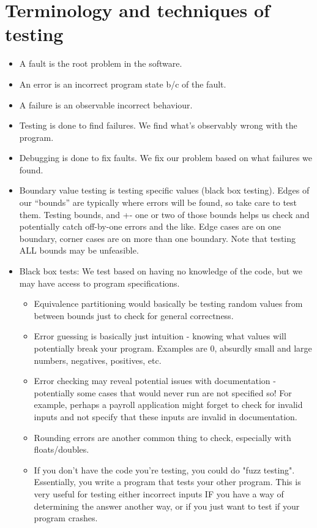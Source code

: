 \documentclass{article}
\author{Clement Tsang}
\begin{document}
\section{Terminology and techniques of testing}
\begin{itemize}
\item A fault is the root problem in the software.  
\item An error is an incorrect program state b/c of the fault.
\item A failure is an observable incorrect behaviour.
\item Testing is done to find failures.  We find what's observably wrong with the program.
\item Debugging is done to fix faults.  We fix our problem based on what failures we found. 
\item Boundary value testing is testing specific values (black box testing).  Edges of our ``bounds'' are typically where errors will be found, so take care to test them.  Testing bounds, and +- one or two of those bounds helps us check and potentially catch off-by-one errors and the like.  Edge cases are on one boundary, corner cases are on more than one boundary.  Note that testing ALL bounds may be unfeasible.
\item Black box tests: We test based on having no knowledge of the code, but we may have access to program specifications.
\begin{itemize}
\item Equivalence partitioning would basically be testing random values from between bounds just to check for general correctness.
\item Error guessing is basically just intuition - knowing what values will potentially break your program.  Examples are 0, absurdly small and large numbers, negatives, positives, etc.
\item Error checking may reveal potential issues with documentation - potentially some cases that would never run are not specified so!  For example, perhaps a payroll application might forget to check for invalid inputs and not specify that these inputs are invalid in documentation.
\item Rounding errors are another common thing to check, especially with floats/doubles.
\item If you don't have the code you're testing, you could do "fuzz testing".  Essentially, you write a program that tests your other program.  This is very useful for testing either incorrect inputs IF you have a way of determining the answer another way, or if you just want to test if your program crashes.

\end{itemize}
\end{itemize}
\end{document}
